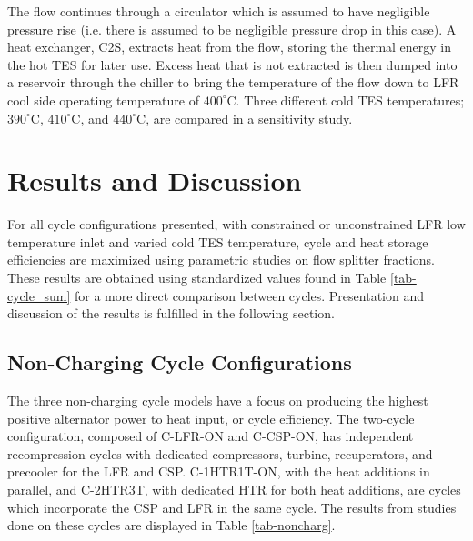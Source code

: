 \begin{paracol}{2}
\linenumbers
\switchcolumn

The flow continues through a circulator which is assumed to have negligible pressure rise (i.e. there is assumed to be negligible pressure drop in this case). A heat exchanger, C2S, extracts heat from the flow, storing the thermal energy in the hot TES for later use. Excess heat that is not extracted is then dumped into a reservoir through the chiller to bring the temperature of the flow down to LFR cool side operating temperature of $400^{\circ}$C. Three different cold TES temperatures; $390^{\circ}$C, $410^{\circ}$C, and $440^{\circ}$C, are compared in a sensitivity study. 



\section{Results and Discussion}

For all cycle configurations presented, with constrained or unconstrained LFR low temperature inlet and varied cold TES temperature, cycle and heat storage efficiencies are maximized using parametric studies on flow splitter fractions. These results are obtained using standardized values found in Table \ref{tab-cycle_sum} for a more direct comparison between cycles. Presentation and discussion of the results is fulfilled in the following section. 

\subsection{Non-Charging Cycle Configurations}

The three non-charging cycle models have a focus on producing the highest positive alternator power to heat input, or cycle efficiency. The two-cycle configuration, composed of C-LFR-ON and C-CSP-ON, has independent recompression cycles with dedicated compressors, turbine, recuperators, and precooler for the LFR and CSP. C-1HTR1T-ON, with the heat additions in parallel, and C-2HTR3T, with dedicated HTR for both heat additions, are cycles which incorporate the CSP and LFR in the same cycle. The results from studies done on these cycles are displayed in Table \ref{tab-noncharg}. 


\end{paracol}
